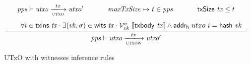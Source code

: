 \begin{figure}
  \begin{equation}
    \label{eq:utxo-witness-inductive}
    \inference
    { \var{pps} \vdash \var{utxo} \trans{utxo}{tx} \var{utxo'}
      & \var{maxTxSize} \mapsto \var{t} \in \var{pps} & \fun{txSize}~\var{tx} \leq t \\ ~ \\
      & \forall i \in \txins{tx} \cdot \exists (\var{vk}, \sigma) \in \wits{\var{tx}}
      \cdot
      \mathcal{V}^\sigma_{\var{vk}}~{\serialised{\txbody{tx}}}
      \wedge  \fun{addr_h}~{utxo}~i = \hash{vk}\\
    }
    {\var{pps} \vdash \var{utxo} \trans{utxow}{tx} \var{utxo'}}
  \end{equation}
  \caption{UTxO with witnesses inference rules}
  \label{fig:rules:utxow}
\end{figure}
